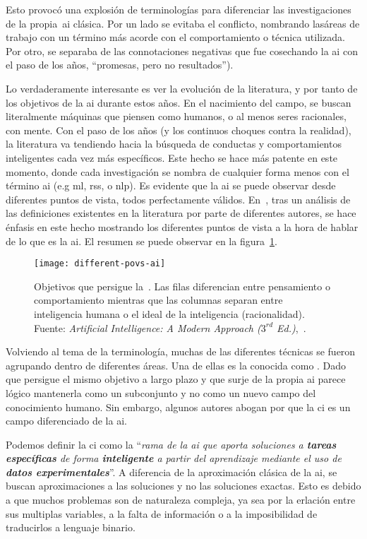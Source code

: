 Esto provocó una explosión de terminologías para diferenciar las investigaciones de la propia~\ac{ai} clásica. Por un lado se evitaba el conflicto, nombrando lasáreas de trabajo con un término más acorde con el comportamiento o técnica utilizada. Por otro, se separaba de las connotaciones negativas que fue cosechando la \ac{ai} con el paso de los años, \enquote{promesas, pero no resultados}).

Lo verdaderamente interesante es ver la evolución de la literatura, y por tanto de los objetivos de la \ac{ai} durante estos años. En el nacimiento del campo, se buscan literalmente máquinas que piensen como humanos, o al menos seres racionales, con mente. Con el paso de los años (y los continuos choques contra la realidad), la literatura va tendiendo hacia la búsqueda de conductas y comportamientos inteligentes cada vez más específicos. Este hecho se hace más patente en este momento, donde cada investigación se nombra de cualquier forma menos con el término \ac{ai} (e.g \ac{ml}, \acp{rs}, o \ac{nlp}). Es evidente que la \ac{ai} se puede observar desde diferentes puntos de vista, todos perfectamente válidos. En~\cite{russell2003artificial}, tras un análisis de las definiciones existentes en la literatura por parte de diferentes autores, se hace énfasis en este hecho mostrando los diferentes puntos de vista a la hora de hablar de lo que es la \ac{ai}. El resumen se puede observar en la figura~\ref{fig:different-povs-ai}.

\begin{figure}
	\texttt{[image: different-povs-ai]}
	\caption{Objetivos que persigue la~. Las filas diferencian entre pensamiento o comportamiento mientras que las columnas separan entre inteligencia humana o el ideal de la inteligencia (racionalidad). Fuente: \textit{Artificial Intelligence: A Modern Approach ($3^{rd}$ Ed.)},~\cite{russell2003artificial}.}
	\label{fig:different-povs-ai}
\end{figure}

Volviendo al tema de la terminología, muchas de las diferentes técnicas se fueron agrupando dentro de diferentes áreas. Una de ellas es la conocida como . Dado que persigue el mismo objetivo a largo plazo y que surje de la propia \ac{ai} parece lógico mantenerla como un subconjunto y no como un nuevo campo del conocimiento humano. Sin embargo, algunos autores abogan por que la \ac{ci} es un campo diferenciado de la \ac{ai}.

Podemos definir la \ac{ci} como la \enquote{\textit{rama de la \ac{ai} que aporta soluciones a \textbf{tareas específicas} de forma \textbf{inteligente} a partir del aprendizaje mediante el uso de \textbf{datos experimentales}}}. A diferencia de la aproximación clásica de la \ac{ai}, se buscan aproximaciones a las soluciones y no las soluciones exactas. Esto es debido a que muchos problemas son de naturaleza compleja, ya sea por la erlación entre sus multiplas variables, a la falta de información o a la imposibilidad de traducirlos a lenguaje binario.

